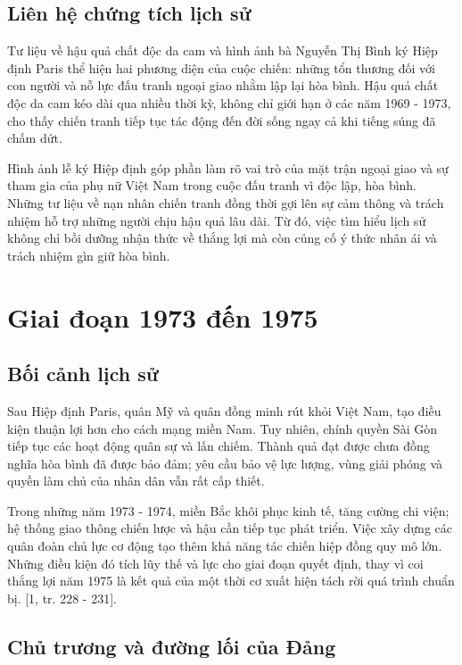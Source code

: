 \subsection{Liên hệ chứng tích lịch sử}

Tư liệu về hậu quả chất độc da cam và hình ảnh bà Nguyễn Thị Bình ký Hiệp định Paris thể hiện hai phương diện của cuộc chiến: những tổn thương đối với con người và nỗ lực đấu tranh ngoại giao nhằm lập lại hòa bình. Hậu quả chất độc da cam kéo dài qua nhiều thời kỳ, không chỉ giới hạn ở các năm 1969 - 1973, cho thấy chiến tranh tiếp tục tác động đến đời sống ngay cả khi tiếng súng đã chấm dứt.

Hình ảnh lễ ký Hiệp định góp phần làm rõ vai trò của mặt trận ngoại giao và sự tham gia của phụ nữ Việt Nam trong cuộc đấu tranh vì độc lập, hòa bình. Những tư liệu về nạn nhân chiến tranh đồng thời gợi lên sự cảm thông và trách nhiệm hỗ trợ những người chịu hậu quả lâu dài. Từ đó, việc tìm hiểu lịch sử không chỉ bồi dưỡng nhận thức về thắng lợi mà còn củng cố ý thức nhân ái và trách nhiệm gìn giữ hòa bình.

\section{Giai đoạn 1973 đến 1975}

\subsection{Bối cảnh lịch sử}

Sau Hiệp định Paris, quân Mỹ và quân đồng minh rút khỏi Việt Nam, tạo điều kiện thuận lợi hơn cho cách mạng miền Nam. Tuy nhiên, chính quyền Sài Gòn tiếp tục các hoạt động quân sự và lấn chiếm. Thành quả đạt được chưa đồng nghĩa hòa bình đã được bảo đảm; yêu cầu bảo vệ lực lượng, vùng giải phóng và quyền làm chủ của nhân dân vẫn rất cấp thiết.

Trong những năm 1973 - 1974, miền Bắc khôi phục kinh tế, tăng cường chi viện; hệ thống giao thông chiến lược và hậu cần tiếp tục phát triển. Việc xây dựng các quân đoàn chủ lực cơ động tạo thêm khả năng tác chiến hiệp đồng quy mô lớn. Những điều kiện đó tích lũy thế và lực cho giai đoạn quyết định, thay vì coi thắng lợi năm 1975 là kết quả của một thời cơ xuất hiện tách rời quá trình chuẩn bị. [1, tr. 228 - 231].

\subsection{Chủ trương và đường lối của Đảng}

